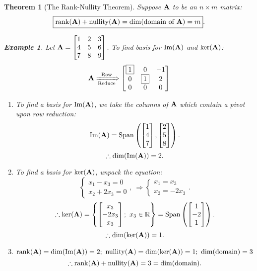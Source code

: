 \documentclass[12pt, a4paper]{article}
\newtheorem{thm}{Theorem}[subsection]
\newtheorem{eg}{Example}[subsection]
\def\R{{\mathbb{R}}}
\def\IM{{\mathrm{Im}}}
\def\Span{\mathrm{Span}}
\def\rank{\mathrm{rank}}
\def\nullity{\mathrm{nullity}}
\def\matrixA{\vb{A}}
\begin{document}
\begin{thm}[The Rank-Nullity Theorem]
	Suppose $\matrixA$ to be an $n\times m$ matrix: \[\boxed{\rank(\matrixA)+\nullity(\matrixA)=\dim(\text{domain of }\matrixA)=m}.\]	
	\begin{eg}
		Let $\matrixA=\begin{bmatrix}1&2&3\\4&5&6\\7&8&9\end{bmatrix}$. To find basis for $\IM(\matrixA)$ and $\ker(\matrixA)$: \[\matrixA\xRightarrow[\text{Reduce}]{\text{Row}}\begin{bmatrix}\boxed{1}&0&-1\\0&\boxed{1}&2\\0&0&0\end{bmatrix}\]
		\begin{enumerate}
			\item To find a basis for $\IM(\matrixA)$, we take the columns of $\matrixA$ which contain a pivot upon row reduction: \[\IM(\matrixA)=\Span\left(\begin{bmatrix}1\\4\\7\end{bmatrix},\begin{bmatrix}2\\5\\8\end{bmatrix}\right).\]\[\therefore\dim(\IM(\matrixA))=2.\]
			\item 	To find a basis for $\ker(\matrixA)$, unpack the equation: \[\begin{cases}x_1-x_3=0\\x_2+2x_3=0\end{cases},\ \Longrightarrow\begin{cases}x_1=x_3\\x_2=-2x_3\end{cases}.\]
			\[\therefore \ker(\matrixA)=\left\{\begin{bmatrix}x_3\\-2x_3\\x_3\end{bmatrix};\ x_3\in\R\right\}=\Span\left(\begin{bmatrix}1\\-2\\1\end{bmatrix}\right).\]
			\[\therefore\dim(\ker(\matrixA))=1.\]
			\item $\rank(\matrixA)=\dim(\IM(\matrixA))=2;\ \nullity(\matrixA)=\dim(\ker(\matrixA))=1;\ \dim(\text{domain})=3$\[\therefore\rank(\matrixA)+\nullity(\matrixA)=3=\dim(\text{domain}).\]
		\end{enumerate}
	\end{eg}
	

\end{thm}
\end{document}
